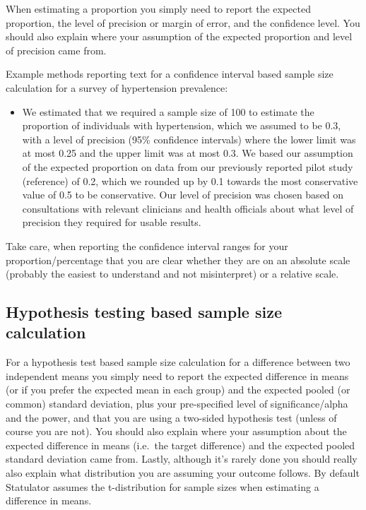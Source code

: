 \documentclass[
]{book}
\providecommand{\tightlist}{%
  \setlength{\itemsep}{0pt}\setlength{\parskip}{0pt}}
\begin{document}
When estimating a proportion you simply need to report the expected proportion, the level of precision or margin of error, and the confidence level. You should also explain where your assumption of the expected proportion and level of precision came from.

Example methods reporting text for a confidence interval based sample size calculation for a survey of hypertension prevalence:

\begin{itemize}
\tightlist
\item
  We estimated that we required a sample size of 100 to estimate the proportion of individuals with hypertension, which we assumed to be 0.3, with a level of precision (95\% confidence intervals) where the lower limit was at most 0.25 and the upper limit was at most 0.3. We based our assumption of the expected proportion on data from our previously reported pilot study (reference) of 0.2, which we rounded up by 0.1 towards the most conservative value of 0.5 to be conservative. Our level of precision was chosen based on consultations with relevant clinicians and health officials about what level of precision they required for usable results.
\end{itemize}

Take care, when reporting the confidence interval ranges for your proportion/percentage that you are clear whether they are on an absolute scale (probably the easiest to understand and not misinterpret) or a relative scale.

\hypertarget{hypothesis-testing-based-sample-size-calculation}{%
\subsection{Hypothesis testing based sample size calculation}\label{hypothesis-testing-based-sample-size-calculation}}

For a hypothesis test based sample size calculation for a difference between two independent means you simply need to report the expected difference in means (or if you prefer the expected mean in each group) and the expected pooled (or common) standard deviation, plus your pre-specified level of significance/alpha and the power, and that you are using a two-sided hypothesis test (unless of course you are not). You should also explain where your assumption about the expected difference in means (i.e.~the target difference) and the expected pooled standard deviation came from. Lastly, although it's rarely done you should really also explain what distribution you are assuming your outcome follows. By default Statulator assumes the t-distribution for sample sizes when estimating a difference in means.
\end{document}
